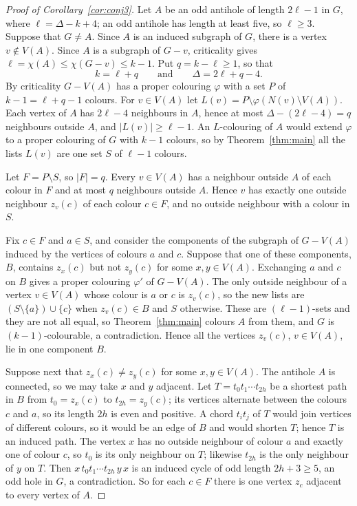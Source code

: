 \documentclass[11pt,a4paper,reqno]{amsart}
\theoremstyle{definition}
\theoremstyle{remark}
\begin{document}
\begin{proof}[Proof of Corollary~\ref{cor:conj3}]
Let $A$ be an odd antihole of length $2\ell-1$ in $G$, where $\ell=\Delta-k+4$; an odd antihole has length at least five, so $\ell\ge3$. Suppose that $G\ne A$. Since $A$ is an induced subgraph of $G$, there is a vertex $v\notin V(A)$. Since $A$ is a subgraph of $G-v$, criticality gives $\ell=\chi(A)\le\chi(G-v)\le k-1$. Put $q=k-\ell\ge1$, so that
\[
k=\ell+q\qquad\text{and}\qquad \Delta=2\ell+q-4.
\]
By criticality $G-V(A)$ has a proper colouring $\varphi$ with a set $P$ of $k-1=\ell+q-1$ colours. For $v\in V(A)$ let $L(v)=P\setminus\varphi(N(v)\setminus V(A))$. Each vertex of $A$ has $2\ell-4$ neighbours in $A$, hence at most $\Delta-(2\ell-4)=q$ neighbours outside $A$, and $|L(v)|\ge\ell-1$. An $L$-colouring of $A$ would extend $\varphi$ to a proper colouring of $G$ with $k-1$ colours, so by Theorem~\ref{thm:main} all the lists $L(v)$ are one set $S$ of $\ell-1$ colours.

Let $F=P\setminus S$, so $|F|=q$. Every $v\in V(A)$ has a neighbour outside $A$ of each colour in $F$ and at most $q$ neighbours outside $A$. Hence $v$ has exactly one outside neighbour $z_v(c)$ of each colour $c\in F$, and no outside neighbour with a colour in $S$.

Fix $c\in F$ and $a\in S$, and consider the components of the subgraph of $G-V(A)$ induced by the vertices of colours $a$ and $c$. Suppose that one of these components, $B$, contains $z_x(c)$ but not $z_y(c)$ for some $x,y\in V(A)$. Exchanging $a$ and $c$ on $B$ gives a proper colouring $\varphi'$ of $G-V(A)$. The only outside neighbour of a vertex $v\in V(A)$ whose colour is $a$ or $c$ is $z_v(c)$, so the new lists are $(S\setminus\{a\})\cup\{c\}$ when $z_v(c)\in B$ and $S$ otherwise. These are $(\ell-1)$-sets and they are not all equal, so Theorem~\ref{thm:main} colours $A$ from them, and $G$ is $(k-1)$-colourable, a contradiction. Hence all the vertices $z_v(c)$, $v\in V(A)$, lie in one component $B$.

Suppose next that $z_x(c)\ne z_y(c)$ for some $x,y\in V(A)$. The antihole $A$ is connected, so we may take $x$ and $y$ adjacent. Let $T=t_0t_1\cdots t_{2h}$ be a shortest path in $B$ from $t_0=z_x(c)$ to $t_{2h}=z_y(c)$; its vertices alternate between the colours $c$ and $a$, so its length $2h$ is even and positive. A chord $t_it_j$ of $T$ would join vertices of different colours, so it would be an edge of $B$ and would shorten $T$; hence $T$ is an induced path. The vertex $x$ has no outside neighbour of colour $a$ and exactly one of colour $c$, so $t_0$ is its only neighbour on $T$; likewise $t_{2h}$ is the only neighbour of $y$ on $T$. Then $x\,t_0t_1\cdots t_{2h}\,y\,x$ is an induced cycle of odd length $2h+3\ge5$, an odd hole in $G$, a contradiction. So for each $c\in F$ there is one vertex $z_c$ adjacent to every vertex of $A$.


\end{proof}
\end{document}
